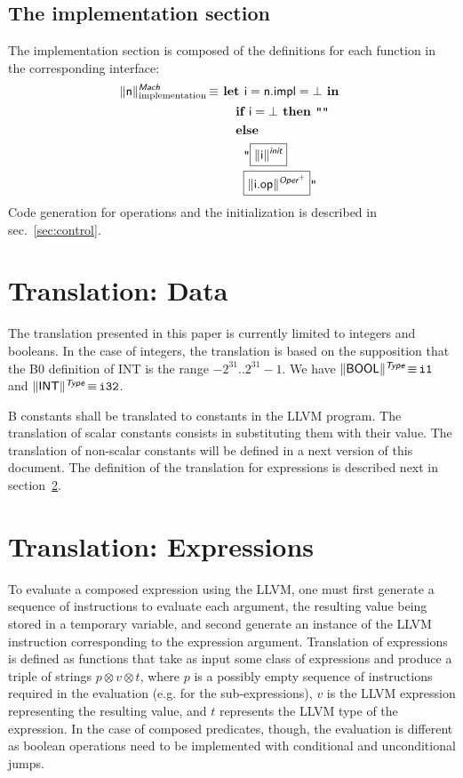 \documentclass{llncs}
\newcommand{\trad}[2]{\ensuremath{\lVert \textsf{#1} \rVert^{\textit{#2}}}}
\DeclareMathOperator{\isdef}{\equiv}
\newcommand{\llvm}[1]{\texttt{#1}}
\newcommand{\B}[1]{\textsf{#1}}
\newcommand{\ListOf}[1]{$\mbox{#1}^+$}
\newcommand{\IF}[0]{\textbf{ if }}
\newcommand{\ELSE}[0]{\textbf{ else }}
\newcommand{\THEN}[0]{\textbf{ then }}
\newcommand{\LET}[0]{\textbf{ let }}
\newcommand{\IN}[0]{\textbf{ in }}
\newcommand{\PH}[1]{\framebox{$#1$}}
\newcommand{\sep}[0]{\otimes}
\begin{document}
\subsection{The implementation section}

The implementation section is composed of the definitions for each function
in the corresponding interface:
\begin{align*}
  \trad{\B{n}}{\B{Mach}}_{\text{implementation}} \isdef
  & \LET \B{i} = \B{n.impl} = \bot \IN\\
  & \quad \IF \B{i} = \bot \THEN \llvm{""} \\
  & \quad \ELSE \\
  & \quad \quad \llvm{"\PH{\trad{\B{i}}{\B{init}}}} \\
  & \quad \quad \llvm{\PH{\trad{\B{i.op}}{\ListOf{\B{Oper}}}}"}
\end{align*}
Code generation for operations and the initialization is described in
sec.~\ref{sec:control}.

\section{Translation: Data}
\label{sec:data}

The translation presented in this paper is currently limited to integers and
booleans. In the case of integers, the translation is based on the supposition
that the B0 definition of \B{INT} is the range $-2^{31}.. 2^{31}-1$. We have
$\trad{BOOL}{\B{Type}} \isdef \llvm{i1}$ and $\trad{INT}{\B{Type}} \isdef
\llvm{i32}$.

B constants shall be translated to constants in the LLVM program. The
translation of scalar constants consists in substituting them with their value.
The translation of non-scalar constants will be defined in a next version of
this document. The definition of the translation for expressions is
described next in section~\ref{sec:expr}.

\section{Translation: Expressions}
\label{sec:expr}

To evaluate a composed expression using the LLVM, one must first generate a
sequence of instructions to evaluate each argument, the resulting value being
stored in a temporary variable, and second generate an instance of the LLVM
instruction corresponding to the expression argument.  Translation of
expressions is defined as functions that take as input some class of expressions
and produce a triple of strings $p \sep v \sep t$, where $p$ is a possibly empty
sequence of instructions required in the evaluation (e.g.  for the
sub-expressions), $v$ is the LLVM expression representing the resulting value,
and $t$ represents the LLVM type of the expression. In the case of composed
predicates, though, the evaluation is different as boolean operations need to be
implemented with conditional and unconditional jumps.
\end{document}
